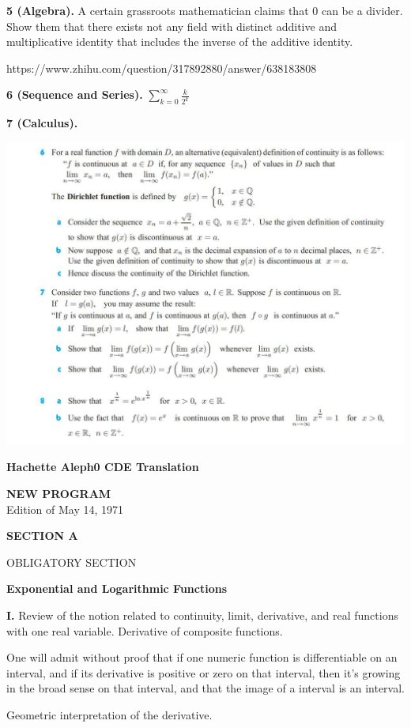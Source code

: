 \documentclass[10pt]{article}
\begin{document}
\begin{CJK*}{UTF8}{gbsn}
\textbf{5 (Algebra).} A certain grassroots mathematician claims that $0$ can be a divider. Show them that there exists not any field with distinct additive and multiplicative identity that includes the inverse of the additive identity.

https://www.zhihu.com/question/317892880/answer/638183808

\textbf{6 (Sequence and Series).} $\displaystyle\sum_{k=0}^\infty \frac{k}{2^k}$

\newpage
\textbf{7 (Calculus).}
\begin{center}
	\includegraphics[width=0.95\linewidth]{photo_2019-06-01_00-00-41}
\end{center}

\newpage
\textbf{Hachette Aleph0 CDE Translation}
\begin{center}
\textbf{NEW PROGRAM}\\
Edition of May 14, 1971

\textbf{SECTION A}
\end{center}
OBLIGATORY SECTION

\textbf{Exponential and Logarithmic Functions}

\textbf{I.} Review of the notion related to continuity, limit, derivative, and real functions with one real variable. Derivative of composite functions.

One will admit without proof that if one numeric function is differentiable on an interval, and if its derivative is positive or zero on that interval, then it's growing in the broad sense on that interval, and that the image of a interval is an interval.

Geometric interpretation of the derivative.


\end{CJK*}
\end{document}
